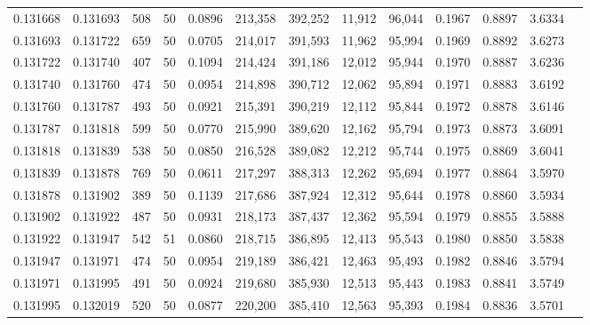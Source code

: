 \begin{tabular}{rrrrrrrrrrrrr}
0.131668 & 0.131693 &   508 &  50 &                                     0.0896 & 213,358 & 392,252 &  11,912 &  96,044 & 0.1967 & 0.8897 & 3.6334 \\
0.131693 & 0.131722 &   659 &  50 &                                     0.0705 & 214,017 & 391,593 &  11,962 &  95,994 & 0.1969 & 0.8892 & 3.6273 \\
0.131722 & 0.131740 &   407 &  50 &                                     0.1094 & 214,424 & 391,186 &  12,012 &  95,944 & 0.1970 & 0.8887 & 3.6236 \\
0.131740 & 0.131760 &   474 &  50 &                                     0.0954 & 214,898 & 390,712 &  12,062 &  95,894 & 0.1971 & 0.8883 & 3.6192 \\
0.131760 & 0.131787 &   493 &  50 &                                     0.0921 & 215,391 & 390,219 &  12,112 &  95,844 & 0.1972 & 0.8878 & 3.6146 \\
0.131787 & 0.131818 &   599 &  50 &                                     0.0770 & 215,990 & 389,620 &  12,162 &  95,794 & 0.1973 & 0.8873 & 3.6091 \\
0.131818 & 0.131839 &   538 &  50 &                                     0.0850 & 216,528 & 389,082 &  12,212 &  95,744 & 0.1975 & 0.8869 & 3.6041 \\
0.131839 & 0.131878 &   769 &  50 &                                     0.0611 & 217,297 & 388,313 &  12,262 &  95,694 & 0.1977 & 0.8864 & 3.5970 \\
0.131878 & 0.131902 &   389 &  50 &                                     0.1139 & 217,686 & 387,924 &  12,312 &  95,644 & 0.1978 & 0.8860 & 3.5934 \\
0.131902 & 0.131922 &   487 &  50 &                                     0.0931 & 218,173 & 387,437 &  12,362 &  95,594 & 0.1979 & 0.8855 & 3.5888 \\
0.131922 & 0.131947 &   542 &  51 &                                     0.0860 & 218,715 & 386,895 &  12,413 &  95,543 & 0.1980 & 0.8850 & 3.5838 \\
0.131947 & 0.131971 &   474 &  50 &                                     0.0954 & 219,189 & 386,421 &  12,463 &  95,493 & 0.1982 & 0.8846 & 3.5794 \\
0.131971 & 0.131995 &   491 &  50 &                                     0.0924 & 219,680 & 385,930 &  12,513 &  95,443 & 0.1983 & 0.8841 & 3.5749 \\
0.131995 & 0.132019 &   520 &  50 &                                     0.0877 & 220,200 & 385,410 &  12,563 &  95,393 & 0.1984 & 0.8836 & 3.5701 \\

\end{tabular}

